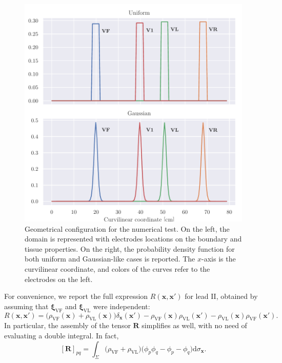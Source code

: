 \documentclass[runningheads]{llncs}
\newcommand{\bs}[1]{\boldsymbol{#1}}
\newcommand{\vx}{\mathbf{x}}
\newcommand{\dd}{\mathrm{d}}
\begin{document}
\begin{figure}[tb]
\begin{tikzpicture}
    
    
    \end{tikzpicture}\hfill
    \includegraphics[scale=0.5]{rho_dist}
    
    \caption{Geometrical configuration for the numerical test. On the left,
    the domain is represented with electrodes locations on the boundary and
    tissue properties. On the right, the probability density function for both
    uniform and Gaussian-like cases is
    reported. The $x$-axis is the curvilinear coordinate, and colors of
    the curves refer to the electrodes on the left.}
    \label{fig:geom2d}
\end{figure}

For convenience, we report the full expression $R(\vx,\vx')$
for lead II, obtained by assuming that $\bs\xi_\mathrm{VF}$
and $\bs\xi_\mathrm{VL}$ were independent:
\[
R(\vx,\vx') = \bigl(\rho_\mathrm{VF}(\vx)+\rho_\mathrm{VL}(\vx)\bigr)\delta_{\vx}(\vx')
- \rho_\mathrm{VF}(\vx)\rho_\mathrm{VL}(\vx') - \rho_\mathrm{VL}(\vx)\rho_\mathrm{VF}(\vx').
\]
In particular, the assembly of the tensor $\mathbf{R}$ simplifies as well, with
no need of evaluating a double integral. In fact,
\[
[\mathbf{R}]_{pq} = 
\int_\Sigma \bigl(\rho_\mathrm{VF}+\rho_\mathrm{VL}\bigr) \bigl(\phi_p\phi_q - \phi_p - \phi_q\bigr) \dd\sigma_\vx.
\]
\end{document}
